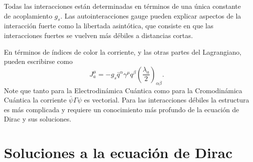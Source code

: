 Todas las interacciones están determinadas en términos de una única constante de acoplamiento $g_s$. Las autointeracciones gauge pueden explicar aspectos de la interacción fuerte como la libertada asintótica, que consiste en que las interacciones fuertes se vuelven más débiles a distancias cortas. 

En términos de índices de color la corriente, y las otras partes del Lagrangiano, pueden escribirse como
\begin{equation}
  \label{eq:223qft}
  J^\mu_a=-g_s\bar{q}^\alpha\gamma^\mu q^\beta\left(\frac{\lambda_a}{2}\right)_{\alpha\beta}.
\end{equation}
Note que tanto para la Electrodinámica Cuántica como para la Cromodinámica Cuántica la corriente $\bar{\psi}\Gamma\psi$ es vectorial. Para las interacciones débiles la estructura es más complicada y requiere un conocimiento más profundo de la ecuación de Dirac y sus soluciones.





\section{Soluciones a la ecuaci\'on de Dirac}
\label{sec:soluc-la-ecuac}

